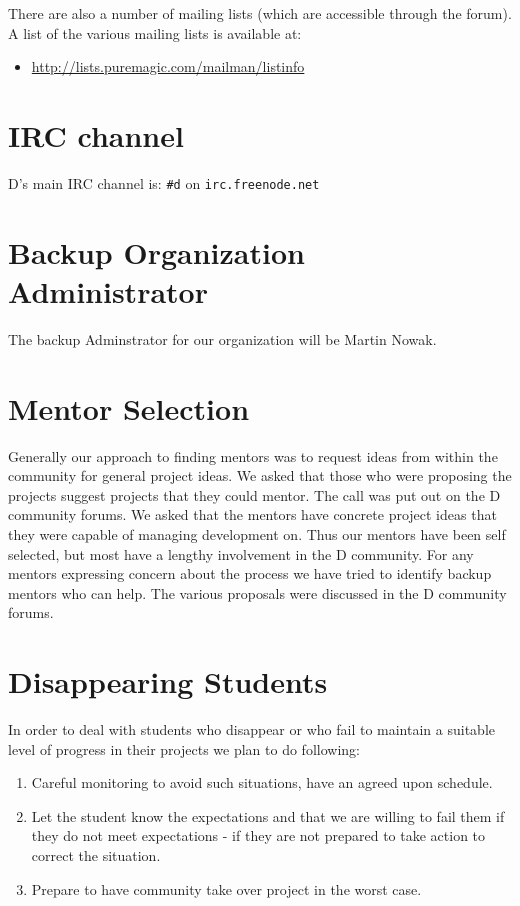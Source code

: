 \documentclass[	DIV=calc,paper=a4,fontsize=11pt,twocolumn]{scrartcl}	%
\begin{document}
There are also a number of mailing lists (which are accessible 
through the forum).  A list of the various mailing lists is
available at:

\begin{itemize}
   \item \url{http://lists.puremagic.com/mailman/listinfo}
\end{itemize}

\section{IRC channel}
D's main IRC channel is:  \texttt{\#d} on \texttt{irc.freenode.net}

\section{Backup Organization Administrator}
The backup Adminstrator for our organization will be Martin Nowak.

\section{Mentor Selection}

Generally our approach to finding mentors was to request ideas
from within the community for general project ideas. We asked
that those who were proposing the projects suggest projects that
they could mentor. The call was put out on the D community forums.
We asked that the mentors have concrete project ideas that
they were capable of managing development on.  Thus our mentors
have been self selected, but most have a lengthy involvement 
in the D community. For any mentors expressing concern about the
process we have tried to identify backup mentors who can help. 
The various proposals were discussed in the D community forums. 

\section{Disappearing Students}
In order to deal with students who disappear or who fail to
maintain a suitable level of progress in their projects we plan
to do following:

\begin{enumerate}
\item Careful monitoring to avoid such situations, have an agreed upon
schedule.
\item Let the student know the expectations and that we are willing
to fail them if they do not meet expectations - if they are not prepared 
to take action to correct the situation.
\item Prepare to have community take over project in the worst case.
\end{enumerate}
\end{document}
